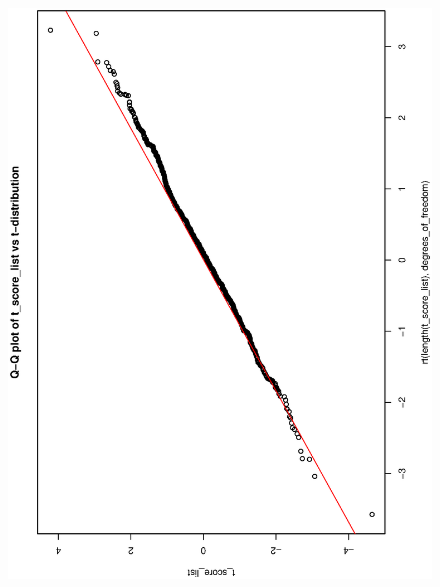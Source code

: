 \documentclass[a4paper,10pt]{article}
\begin{document}
\begin{figure}
\includegraphics[angle=-90, width=1\textwidth]{figures/math650_hw4_t_score_qqplot.eps}
\caption{}\label{f4}
\end{figure}
\end{document}

